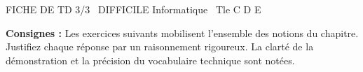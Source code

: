 \documentclass[11pt]{article}
\begin{document}
\begin{tcolorbox}[enhanced,colback=popink,colframe=popink,arc=10pt,boxrule=0pt,left=12pt,right=12pt,top=9pt,bottom=9pt]
{\color{white}\popxbold\small FICHE DE TD 3/3 \textbullet\ DIFFICILE \hfill Informatique \textbullet\ Tle C D E\par}
\end{tcolorbox}
\vspace{4pt}
\noindent\textbf{Consignes :} Les exercices suivants mobilisent l'ensemble des notions du chapitre. Justifiez chaque réponse par un raisonnement rigoureux. La clarté de la démonstration et la précision du vocabulaire technique sont notées.
\end{document}

